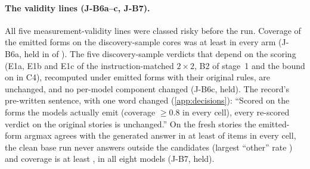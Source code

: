 \begin{table}[!ht]
\centering
\footnotesize
\caption{\textbf{Scoring invariance on the discovery-sample cores.} $M^L$ as in \cref{tab:mass}; $s^L_{\mathrm{ID}}$, $s^E_{\mathrm{ID}}$: the key share under the lower-case and the emitted-form score; $s^E - s^L$ and $r^E - r^L$: paired differences (the sentence read relative to the list read, $r$, is 1 by definition under AFTER). 95\,\% paired cluster-bootstrap intervals.}
\label{tab:invariance}
\scalebox{0.89}{\setlength{\tabcolsep}{4pt}}
\end{table}

\paragraph{The validity lines (J-B6a--c, J-B7).} All five measurement-validity lines were classed risky before the run. Coverage of the emitted forms on the discovery-sample cores was at least \JbSixaCovMin{} in every arm (J-B6a, held in \JbSixaMet{} of \JbSixaEval{}). The five discovery-sample verdicts that depend on the scoring (E1a, E1b and E1c of the instruction-matched $2{\times}2$, B2 of stage~1 and the bound on \fmtBefore{} in C4), recomputed under emitted forms with their original rules, are unchanged, and no per-model component changed (J-B6c, held). The record's pre-written sentence, with one word changed (\cref{app:decisions}): ``Scored on the forms the models actually emit (coverage $\geq 0.8$ in every cell), every re-scored verdict on the original stories is unchanged.'' On the fresh stories the emitted-form argmax agrees with the generated answer in at least \JbSevenAMin{} of items in every cell, the clean base run never answers outside the candidates (largest ``other'' rate \JbSevenOtherMax{}) and coverage is at least \JbSevenCovMin{}, in all eight models (J-B7, held). %

